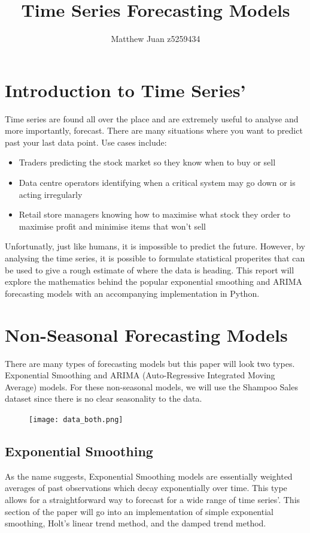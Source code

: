 \documentclass{article}
\title{Time Series Forecasting Models}
\author{Matthew Juan z5259434}
\date{}
\begin{document}
  \maketitle
  \newpage
  \doublespacing
  \tableofcontents
  \singlespacing
  \newpage
  \section{Introduction to Time Series'}
  Time series are found all over the place and are extremely useful to analyse and more importantly, forecast. There are many situations where you want to predict past your last data point. Use cases include:
  \begin{itemize}
    \item Traders predicting the stock market so they know when to buy or sell
    \item Data centre operators identifying when a critical system may go down or is acting irregularly
    \item Retail store managers knowing how to maximise what stock they order to maximise profit and minimise items that won't sell
  \end{itemize}
  Unfortunatly, just like humans, it is impossible to predict the future. However, by analysing the time series, it is possible to formulate statistical properites that can be used to give a rough estimate of where the data is heading. This report will explore the mathematics behind the popular exponential smoothing and ARIMA forecasting models with an accompanying implementation in Python.
  
  \newpage
  
  \section{Non-Seasonal Forecasting Models}
    There are many types of forecasting models but this paper will look two types. Exponential Smoothing and ARIMA (Auto-Regressive Integrated Moving Average) models. For these non-seasonal models, we will use the Shampoo Sales dataset since there is no clear seasonality to the data.
    \begin{figure}[H]
      \texttt{[image: data\_both.png]}
    \end{figure}

  \subsection{Exponential Smoothing}
    As the name suggests, Exponential Smoothing models are essentially weighted averages of past observations which decay exponentially over time. This type allows for a straightforward way to forecast for a wide range of time series'. This section of the paper will go into an implementation of simple exponential smoothing, Holt's linear trend method, and the damped trend method.
  
\end{document}
